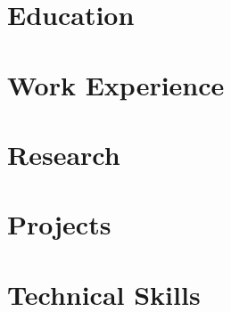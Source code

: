 \documentclass[letterpaper,11pt]{article}
\begin{document}


\section{Education}


\vspace{-10pt}
\section{Work Experience}


\vspace{-10pt}
\section{Research}


\vspace{-10pt}
\section{Projects}


\vspace{-10pt}
\section{Technical Skills}

\end{document}
